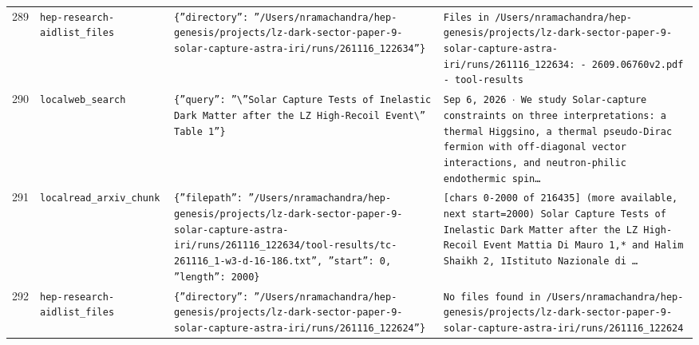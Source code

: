 \documentclass[11pt,a4paper]{article}
\begin{document}
\begin{longtable}{@{}p{}p{}p{}p{}@{}}
289 & \texttt{hep-research-aid}\newline\texttt{list\_\allowbreak{}files} & \texttt{\{''directory'':\allowbreak{} ''/\allowbreak{}Users/\allowbreak{}nramachandra/\allowbreak{}hep-genesis/\allowbreak{}projects/\allowbreak{}lz-dark-sector-paper-9-solar-capture-astra-iri/\allowbreak{}runs/\allowbreak{}261116\_\allowbreak{}122634''\}\allowbreak{}} & \texttt{Files in /\allowbreak{}Users/\allowbreak{}nramachandra/\allowbreak{}hep-genesis/\allowbreak{}projects/\allowbreak{}lz-dark-sector-paper-9-solar-capture-astra-iri/\allowbreak{}runs/\allowbreak{}261116\_\allowbreak{}122634:\allowbreak{}   - 2609.06760v2.pdf   - tool-results} \\
290 & \texttt{local}\newline\texttt{web\_\allowbreak{}search} & \texttt{\{''query'':\allowbreak{} ''\textbackslash{}\allowbreak{}''Solar Capture Tests of Inelastic Dark Matter after the LZ High-Recoil Event\textbackslash{}\allowbreak{}'' Table 1''\}\allowbreak{}} & \texttt{Sep 6,\allowbreak{} 2026 $\cdot$ We study Solar-capture constraints on three interpretations:\allowbreak{} a thermal Higgsino,\allowbreak{} a thermal pseudo-Dirac fermion with off-diagonal vector interactions,\allowbreak{} and neutron-philic endothermic spin\ldots{}\allowbreak{}} \\
291 & \texttt{local}\newline\texttt{read\_\allowbreak{}arxiv\_\allowbreak{}chunk} & \texttt{\{''filepath'':\allowbreak{} ''/\allowbreak{}Users/\allowbreak{}nramachandra/\allowbreak{}hep-genesis/\allowbreak{}projects/\allowbreak{}lz-dark-sector-paper-9-solar-capture-astra-iri/\allowbreak{}runs/\allowbreak{}261116\_\allowbreak{}122634/\allowbreak{}tool-results/\allowbreak{}tc-261116\_\allowbreak{}1-w3-d-16-186.txt'',\allowbreak{} ''start'':\allowbreak{} 0,\allowbreak{} ''length'':\allowbreak{} 2000\}\allowbreak{}} & \texttt{[chars 0-2000 of 216435]\allowbreak{} (more available,\allowbreak{} next start=\allowbreak{}2000)\allowbreak{}  Solar Capture Tests of Inelastic Dark Matter after the LZ High-Recoil Event Mattia Di Mauro 1,\allowbreak{}* and Halim Shaikh 2,\allowbreak{}\dag{}\allowbreak{} 1Istituto Nazionale di \ldots{}\allowbreak{}} \\
292 & \texttt{hep-research-aid}\newline\texttt{list\_\allowbreak{}files} & \texttt{\{''directory'':\allowbreak{} ''/\allowbreak{}Users/\allowbreak{}nramachandra/\allowbreak{}hep-genesis/\allowbreak{}projects/\allowbreak{}lz-dark-sector-paper-9-solar-capture-astra-iri/\allowbreak{}runs/\allowbreak{}261116\_\allowbreak{}122624''\}\allowbreak{}} & \texttt{No files found in /\allowbreak{}Users/\allowbreak{}nramachandra/\allowbreak{}hep-genesis/\allowbreak{}projects/\allowbreak{}lz-dark-sector-paper-9-solar-capture-astra-iri/\allowbreak{}runs/\allowbreak{}261116\_\allowbreak{}122624} \\

\end{longtable}
\end{document}
